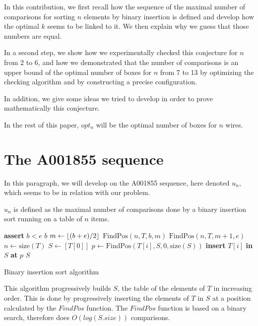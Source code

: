 \documentclass[11pt, a4paper]{article}
\DeclarePairedDelimiter{\floor}{\lfloor}{\rfloor}
\begin{document}
In this contribution, we first recall how the sequence of the maximal number of
comparisons for sorting $n$ elements by binary insertion is defined and develop
how the optimal $k$ seems to be linked to it.  We then explain why we guess that
those numbers are equal.

In a second step, we show how we experimentally checked this conjecture for $n$ from 2 to 6, and
how we demonstrated that the number of comparisons is an upper bound of the
optimal number of boxes for $n$ from 7 to 13 by optimizing the checking
algorithm and by constructing a precise configuration.

In addition, we give some ideas we tried to develop in order to prove
mathematically this conjecture.

In the rest of this paper, $opt_n$ will be the optimal number of boxes for $n$
wires.


\section{The A001855 sequence}

In this paragraph, we will develop on the A001855 sequence, here denoted $u_n$,
which seems to be in relation with our problem.

$u_n$ is defined as the maximal number of comparisons done by a binary
insertion sort running on a table of $n$ items.

\begin{algorithm}
\begin{algorithmic}
	\State \textbf{assert} $b < e$
		\State \Return $b$
	\Else
		\State $m \gets \floor{(b+e)/2}$
			\State \Return $\mathrm{FindPos}(n, T, b, m)$
		\Else
			\State \Return $\mathrm{FindPos}(n, T, m+1, e)$
		\EndIf
	\EndIf
\EndFunction
	\\
	\State $n \gets \mathrm{size}(T)$
	\State $S \gets [ T[0] ]$
		\State $p \gets \mathrm{FindPos}(T[i], S, 0, \mathrm{size}(S))$
		\State \textbf{insert} $T[i]$ \textbf{in} $S$ \textbf{at} $p$
	\EndFor
	\State \Return $S$
\EndFunction
\end{algorithmic}
\caption{Binary insertion sort algorithm}
\end{algorithm}

This algorithm progressively builds $S$, the table of the elements of $T$ in
increasing order. This is done by progressively inserting the elements of $T$ in
$S$ at a position calculated by the $FindPos$ function. The $FindPos$ function
is based on a binary search, therefore does $O(log(S.size))$ comparisons.
\end{document}
